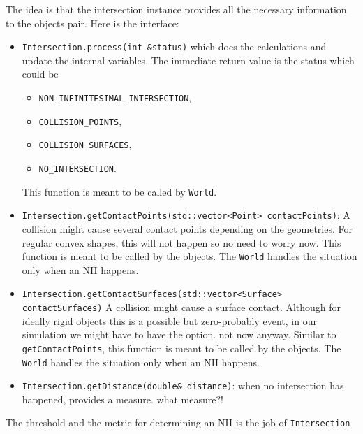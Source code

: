 \documentclass[a4paper]{report}
\newcommand{\cm}[1]{{\color{red}#1}}
\begin{document}
The idea is that the intersection instance provides all the necessary information to the objects pair. Here is the interface:
\begin{itemize}
	\item \verb+Intersection.process(int &status)+ which does the calculations and update the internal variables. The immediate return value is the status which could be 
	\begin{itemize}
		\item \verb+NON_INFINITESIMAL_INTERSECTION+,
		\item \verb+COLLISION_POINTS+, 
		\item \verb+COLLISION_SURFACES+, 
		\item \verb+NO_INTERSECTION+.
	\end{itemize}
	This function is meant to be called by \verb+World+.
	\item \verb+Intersection.getContactPoints(std::vector<Point> contactPoints)+: A collision might cause several contact points depending on the geometries. \cm{For regular convex shapes, this will not happen so no need to worry now.} This function is meant to be called by the objects. The \verb+World+ handles the situation only when an NII happens.
	\item \verb+Intersection.getContactSurfaces(std::vector<Surface> contactSurfaces)+ A collision might cause a surface contact. Although for ideally rigid objects this is a possible but zero-probably event, in our simulation we might have to have the option. \cm{not now anyway.} Similar to \verb+getContactPoints+, this function is meant to be called by the objects. The \verb+World+ handles the situation only when an NII happens.
	\item \verb+Intersection.getDistance(double& distance)+: when no intersection has happened, provides a measure. \cm{what measure?!}
\end{itemize}

The threshold and the metric for determining an NII is the job of \verb+Intersection+




\end{document}
